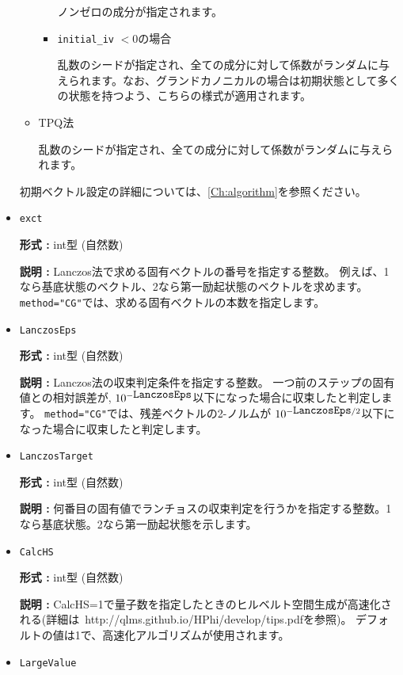 \begin{itemize}
\begin{itemize}
\begin{itemize}
ノンゼロの成分が指定されます。

\item{ \verb|initial_iv| $< 0$の場合}

乱数のシードが指定され、全ての成分に対して係数がランダムに与えられます。なお、グランドカノニカルの場合は初期状態として多くの状態を持つよう、こちらの様式が適用されます。
\end{itemize}

\item{TPQ法}

乱数のシードが指定され、全ての成分に対して係数がランダムに与えられます。
\end{itemize}
初期ベクトル設定の詳細については、\ref{Ch:algorithm}を参照ください。
 
 \item  \verb|exct|

{\bf 形式 :} int型 (自然数)

{\bf 説明 :} Lanczos法で求める固有ベクトルの番号を指定する整数。
例えば、1なら基底状態のベクトル、2なら第一励起状態のベクトルを求めます。
\verb|method="CG"|では、求める固有ベクトルの本数を指定します。

\item   \verb|LanczosEps|
   
{\bf 形式 :} int型 (自然数)

{\bf 説明 :} Lanczos法の収束判定条件を指定する整数。
一つ前のステップの固有値との相対誤差が,
$10^{- \verb|LanczosEps|}$以下になった場合に収束したと判定します。
\verb|method="CG"|では、残差ベクトルの2-ノルムが
$10^{- \verb|LanczosEps|/2}$以下になった場合に収束したと判定します。

 \item  \verb|LanczosTarget| 
   
 {\bf 形式 :} int型 (自然数)

  {\bf 説明 :} 何番目の固有値でランチョスの収束判定を行うかを指定する整数。1なら基底状態。2なら第一励起状態を示します。

 \item \verb|CalcHS|

 {\bf 形式 :} int型 (自然数)

 {\bf 説明 :} CalcHS=1で量子数を指定したときのヒルベルト空間生成が高速化される(詳細は~http://qlms.github.io/HPhi/develop/tips.pdfを参照)。
デフォルトの値は1で、高速化アルゴリズムが使用されます。

     
\item \verb|LargeValue|


\end{itemize}
